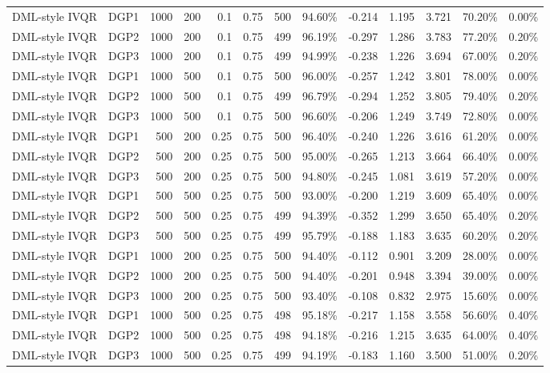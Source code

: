 \begin{landscape}
\begin{longtable}{llrrrrrrrrrrr}
DML-style IVQR & DGP1 & 1000 & 200 & 0.1 & 0.75 & 500 & 94.60\% & -0.214 & 1.195 & 3.721 & 70.20\% & 0.00\% \\
DML-style IVQR & DGP2 & 1000 & 200 & 0.1 & 0.75 & 499 & 96.19\% & -0.297 & 1.286 & 3.783 & 77.20\% & 0.20\% \\
DML-style IVQR & DGP3 & 1000 & 200 & 0.1 & 0.75 & 499 & 94.99\% & -0.238 & 1.226 & 3.694 & 67.00\% & 0.20\% \\
DML-style IVQR & DGP1 & 1000 & 500 & 0.1 & 0.75 & 500 & 96.00\% & -0.257 & 1.242 & 3.801 & 78.00\% & 0.00\% \\
DML-style IVQR & DGP2 & 1000 & 500 & 0.1 & 0.75 & 499 & 96.79\% & -0.294 & 1.252 & 3.805 & 79.40\% & 0.20\% \\
DML-style IVQR & DGP3 & 1000 & 500 & 0.1 & 0.75 & 500 & 96.60\% & -0.206 & 1.249 & 3.749 & 72.80\% & 0.00\% \\
DML-style IVQR & DGP1 & 500 & 200 & 0.25 & 0.75 & 500 & 96.40\% & -0.240 & 1.226 & 3.616 & 61.20\% & 0.00\% \\
DML-style IVQR & DGP2 & 500 & 200 & 0.25 & 0.75 & 500 & 95.00\% & -0.265 & 1.213 & 3.664 & 66.40\% & 0.00\% \\
DML-style IVQR & DGP3 & 500 & 200 & 0.25 & 0.75 & 500 & 94.80\% & -0.245 & 1.081 & 3.619 & 57.20\% & 0.00\% \\
DML-style IVQR & DGP1 & 500 & 500 & 0.25 & 0.75 & 500 & 93.00\% & -0.200 & 1.219 & 3.609 & 65.40\% & 0.00\% \\
DML-style IVQR & DGP2 & 500 & 500 & 0.25 & 0.75 & 499 & 94.39\% & -0.352 & 1.299 & 3.650 & 65.40\% & 0.20\% \\
DML-style IVQR & DGP3 & 500 & 500 & 0.25 & 0.75 & 499 & 95.79\% & -0.188 & 1.183 & 3.635 & 60.20\% & 0.20\% \\
DML-style IVQR & DGP1 & 1000 & 200 & 0.25 & 0.75 & 500 & 94.40\% & -0.112 & 0.901 & 3.209 & 28.00\% & 0.00\% \\
DML-style IVQR & DGP2 & 1000 & 200 & 0.25 & 0.75 & 500 & 94.40\% & -0.201 & 0.948 & 3.394 & 39.00\% & 0.00\% \\
DML-style IVQR & DGP3 & 1000 & 200 & 0.25 & 0.75 & 500 & 93.40\% & -0.108 & 0.832 & 2.975 & 15.60\% & 0.00\% \\
DML-style IVQR & DGP1 & 1000 & 500 & 0.25 & 0.75 & 498 & 95.18\% & -0.217 & 1.158 & 3.558 & 56.60\% & 0.40\% \\
DML-style IVQR & DGP2 & 1000 & 500 & 0.25 & 0.75 & 498 & 94.18\% & -0.216 & 1.215 & 3.635 & 64.00\% & 0.40\% \\
DML-style IVQR & DGP3 & 1000 & 500 & 0.25 & 0.75 & 499 & 94.19\% & -0.183 & 1.160 & 3.500 & 51.00\% & 0.20\% \\

\end{longtable}
\end{landscape}
